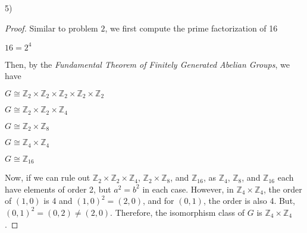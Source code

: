 \documentclass[executivepaper]{article}
\begin{document}
\begin{flushleft}

5) 
\begin{proof}

Similar to problem $2$, we first compute the prime factorization of 16

\begin{center}

$16=2^4$

\end{center}

Then, by the \textit{Fundamental Theorem of Finitely Generated Abelian Groups}, we have

\begin{center}

$G \cong \mathbb{Z}_{2} \times \mathbb{Z}_{2} \times \mathbb{Z}_{2} \times \mathbb{Z}_{2} \times \mathbb{Z}_{2}$

\vspace{2mm}

$G \cong \mathbb{Z}_{2} \times \mathbb{Z}_{2} \times \mathbb{Z}_{4}$

\vspace{2mm}

$G \cong \mathbb{Z}_{2} \times \mathbb{Z}_{8}$

\vspace{2mm}

$G \cong \mathbb{Z}_{4} \times \mathbb{Z}_{4}$

\vspace{2mm}

$G \cong \mathbb{Z}_{16}$

\end{center}

Now, if we can rule out $\mathbb{Z}_{2} \times \mathbb{Z}_{2} \times \mathbb{Z}_{4}$, $\mathbb{Z}_{2} \times \mathbb{Z}_{8}$, and $\mathbb{Z}_{16}$, as $\mathbb{Z}_{4}$, $\mathbb{Z}_{8}$, and $\mathbb{Z}_{16}$ each have elements of order 2, but $a^2=b^2$ in each case. However, in $\mathbb{Z}_{4} \times \mathbb{Z}_{4}$, the order of $(1,0)$ is 4 and $(1,0)^2=(2,0)$, and for $(0,1)$, the order is also 4. But, $(0,1)^2=(0,2) \neq (2,0)$. Therefore, the isomorphism class of $G$ is $\mathbb{Z}_{4} \times \mathbb{Z}_{4}$. 

\end{proof}

\end{flushleft}
\end{document}
